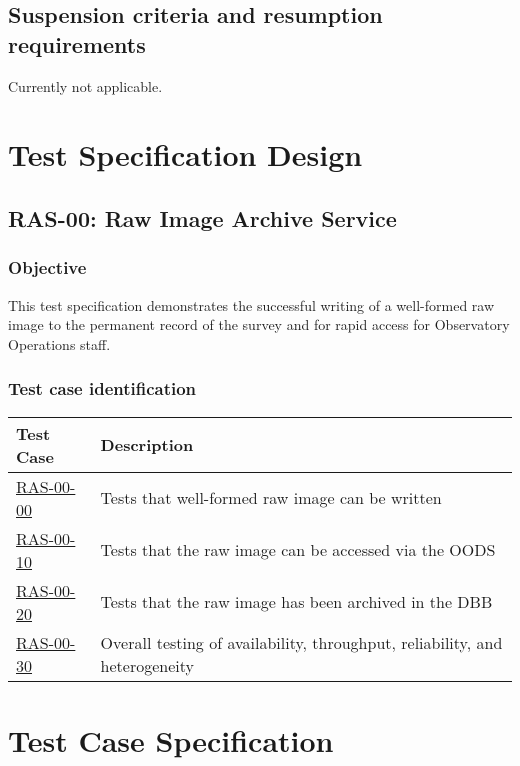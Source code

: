 \documentclass[DM,lsstdraft,STS,toc]{lsstdoc}
\begin{document}
\subsection{Suspension criteria and resumption requirements}
\label{suspension}

Currently not applicable.


\section{Test Specification Design}
\label{sec:Test Specification Design}
\subsection{RAS-00: Raw Image Archive Service}


\subsubsection{Objective}
This test specification demonstrates the successful writing of a
well-formed raw image to the permanent record of the survey and
for rapid access for Observatory Operations staff.


\subsubsection{Test case identification}


\begin{longtable} {|p{}|p{}|}\hline
\textbf{Test Case} & \textbf{Description} \\\hline
\hyperref[ras-00-00]{RAS-00-00} & Tests that well-formed raw image can be written \\\hline
\hyperref[ras-00-10]{RAS-00-10} & Tests that the raw image can be accessed via the OODS \\\hline
\hyperref[ras-00-20]{RAS-00-20} & Tests that the raw image has been archived in the DBB \\\hline
\hyperref[ras-00-30]{RAS-00-30} & Overall testing of availability, throughput, reliability, and heterogeneity \\\hline
\end{longtable}


\section{Test Case Specification}
\end{document}
